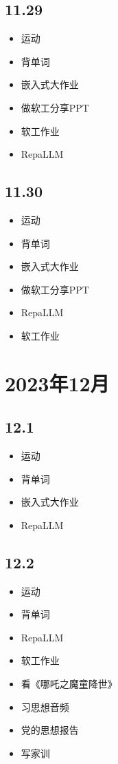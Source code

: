 \documentclass[UTF8]{ctexart}
\begin{document}
\subsection*{11.29}
\begin{itemize}
    \item 运动
    \item 背单词
    \item 嵌入式大作业
    \item 做软工分享PPT
    \item 软工作业
    \item RepaLLM
\end{itemize}

\subsection*{11.30}
\begin{itemize}
    \item 运动
    \item 背单词
    \item 嵌入式大作业
    \item 做软工分享PPT
    \item RepaLLM
    \item 软工作业
\end{itemize}

\section*{2023年12月}

\subsection*{12.1}
\begin{itemize}
    \item 运动
    \item 背单词
    \item 嵌入式大作业
    \item RepaLLM
\end{itemize}

\subsection*{12.2}
\begin{itemize}
    \item 运动
    \item 背单词
    \item RepaLLM
    \item 软工作业
    \item 看《哪吒之魔童降世》
    \item 习思想音频
    \item 党的思想报告
    \item 写家训
\end{itemize}
\end{document}
